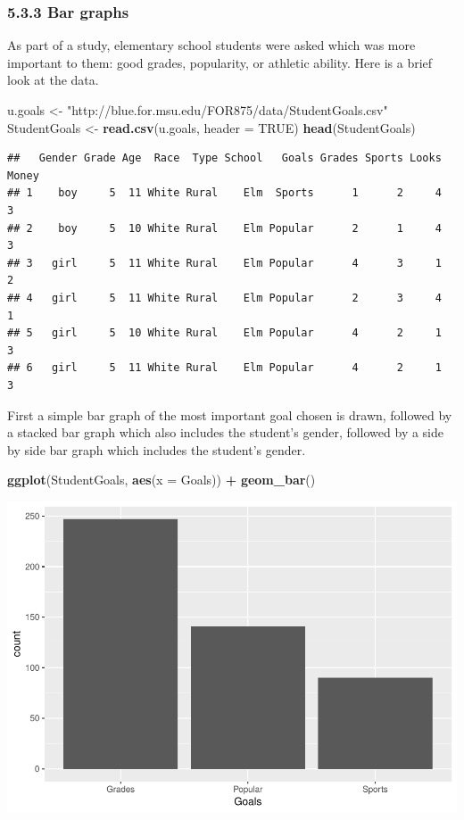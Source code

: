 \documentclass[]{article}
\newenvironment{Shaded}{\begin{snugshade}}{\end{snugshade}}
\newcommand{\KeywordTok}[1]{\textcolor[rgb]{0.13,0.29,0.53}{\textbf{#1}}}
\newcommand{\DataTypeTok}[1]{\textcolor[rgb]{0.13,0.29,0.53}{#1}}
\newcommand{\StringTok}[1]{\textcolor[rgb]{0.31,0.60,0.02}{#1}}
\newcommand{\OtherTok}[1]{\textcolor[rgb]{0.56,0.35,0.01}{#1}}
\newcommand{\OperatorTok}[1]{\textcolor[rgb]{0.81,0.36,0.00}{\textbf{#1}}}
\newcommand{\NormalTok}[1]{#1}
\begin{document}
\subsubsection{5.3.3 Bar graphs}\label{bar-graphs}

As part of a study, elementary school students were asked which was more
important to them: good grades, popularity, or athletic ability. Here is
a brief look at the data.

\begin{Shaded}
\begin{Highlighting}[]
\NormalTok{u.goals <-}\StringTok{ "http://blue.for.msu.edu/FOR875/data/StudentGoals.csv"}
\NormalTok{StudentGoals <-}\StringTok{ }\KeywordTok{read.csv}\NormalTok{(u.goals, }\DataTypeTok{header =} \OtherTok{TRUE}\NormalTok{)}
\KeywordTok{head}\NormalTok{(StudentGoals)}
\end{Highlighting}
\end{Shaded}

\begin{verbatim}
##   Gender Grade Age  Race  Type School   Goals Grades Sports Looks Money
## 1    boy     5  11 White Rural    Elm  Sports      1      2     4     3
## 2    boy     5  10 White Rural    Elm Popular      2      1     4     3
## 3   girl     5  11 White Rural    Elm Popular      4      3     1     2
## 4   girl     5  11 White Rural    Elm Popular      2      3     4     1
## 5   girl     5  10 White Rural    Elm Popular      4      2     1     3
## 6   girl     5  11 White Rural    Elm Popular      4      2     1     3
\end{verbatim}

First a simple bar graph of the most important goal chosen is drawn,
followed by a stacked bar graph which also includes the student's
gender, followed by a side by side bar graph which includes the
student's gender.

\begin{Shaded}
\begin{Highlighting}[]
\KeywordTok{ggplot}\NormalTok{(StudentGoals, }\KeywordTok{aes}\NormalTok{(}\DataTypeTok{x =}\NormalTok{ Goals)) }\OperatorTok{+}\StringTok{ }\KeywordTok{geom_bar}\NormalTok{()}
\end{Highlighting}
\end{Shaded}

\includegraphics{stt-301-programming_files/figure-latex/unnamed-chunk-72-1.pdf}
\end{document}
